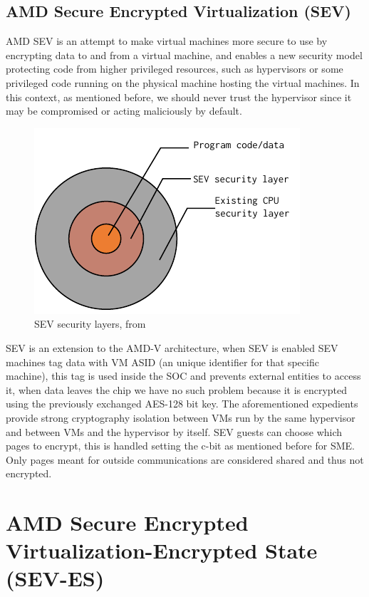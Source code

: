 \documentclass[twocolumn]{article}
\begin{document}
\subsection{AMD Secure Encrypted Virtualization (SEV)}

    AMD SEV is an attempt to make virtual machines more secure to use by encrypting data to and from a virtual machine, and enables a new security model protecting code from higher privileged resources, such as hypervisors or some privileged code running on the physical machine hosting the virtual machines. In this context, as mentioned before, we should never trust the hypervisor since it may be compromised or acting maliciously by default.

    \begin{figure}
        \centering
        \includegraphics[scale=0.9]{img/security-layers.pdf}
        \caption{SEV security layers, from \cite{memory-encryption}}
    \end{figure}

    SEV is an extension to the AMD-V architecture, when SEV is enabled SEV machines tag data with VM ASID (an unique identifier for that specific machine), this tag is used inside the SOC and prevents external entities to access it, when data leaves the chip we have no such problem because it is encrypted using the previously exchanged AES-128 bit key. The aforementioned expedients provide strong cryptography isolation between VMs run by the same hypervisor and between VMs and the hypervisor by itself. SEV guests can choose which pages to encrypt, this is handled setting the c-bit as mentioned before for SME. Only pages meant for outside communications are considered shared and thus not encrypted.

\section{AMD Secure Encrypted Virtualization-Encrypted State (SEV-ES)}
\end{document}
